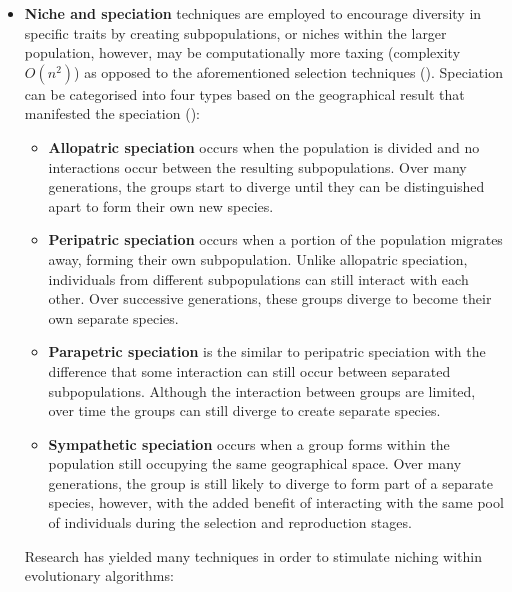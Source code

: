 \begin{itemize}
	\item \textbf{Niche and speciation} techniques are employed to encourage diversity in specific traits by creating subpopulations, or niches within the larger population, however, may be computationally more taxing (complexity $O(n^2)$) as opposed to the aforementioned selection techniques (\cite{back2012handbook}). Speciation can be categorised into four types based on the geographical result that manifested the speciation (\cite{michaelCilliers}):
	\begin{itemize}
		\item \textbf{Allopatric speciation} occurs when the population is divided and no interactions occur between the resulting sub\-populations. Over many generations, the groups start to diverge until they can be distinguished apart to form their own new species.
		\item \textbf{Peripatric speciation} occurs when a portion of the population migrates away, forming their own sub\-population. Unlike allopatric speciation, individuals from different sub\-populations can still interact with each other. Over successive generations, these groups diverge to become their own separate species.
		\item \textbf{Parapetric speciation} is the similar to peripatric speciation with the difference that some interaction can still occur between separated sub\-populations. Although the interaction between groups are limited, over time the groups can still diverge to create separate species.
		\item \textbf{Sympathetic speciation} occurs when a group forms within the population still occupying the same geographical space. Over many generations, the group is still likely to diverge to form part of a separate species, however, with the added benefit of interacting with the same pool of individuals during the selection and reproduction stages. 
	\end{itemize}
	
	Research has yielded many techniques in order to stimulate niching within evolutionary algorithms: 
	

\end{itemize}
